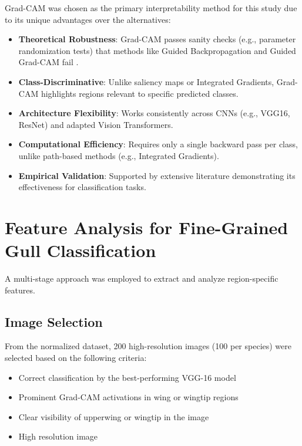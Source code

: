 \documentclass[a4paper,12pt]{report}
\begin{document}
Grad-CAM was chosen as the primary interpretability method for this study due to its unique advantages over the alternatives:

\begin{itemize}
\item \textbf{Theoretical Robustness}: Grad-CAM passes sanity checks (e.g., parameter randomization tests) that methods like Guided Backpropagation and Guided Grad-CAM fail \citep{Adebayo2018}.
\item \textbf{Class-Discriminative}: Unlike saliency maps or Integrated Gradients, Grad-CAM highlights regions relevant to specific predicted classes.
\item \textbf{Architecture Flexibility}: Works consistently across CNNs (e.g., VGG16, ResNet) and adapted Vision Transformers.
\item \textbf{Computational Efficiency}: Requires only a single backward pass per class, unlike path-based methods (e.g., Integrated Gradients).
\item \textbf{Empirical Validation}: Supported by extensive literature \citep{Selvaraju_2019, chefer2021generic} demonstrating its effectiveness for classification tasks.
\end{itemize}

\section{Feature Analysis for Fine-Grained Gull Classification}

A multi-stage approach was employed to extract and analyze region-specific features.

\subsection{Image Selection}
From the normalized dataset, 200 high-resolution images (100 per species) were selected based on the following criteria:
\begin{itemize}
\item Correct classification by the best-performing VGG-16 model
\item Prominent Grad-CAM activations in wing or wingtip regions
\item Clear visibility of upperwing or wingtip in the image
\item High resolution image
\end{itemize}
\end{document}
